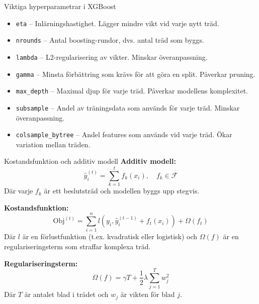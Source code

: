 \documentclass[10pt,english]{beamer}
\begin{document}
\begin{frame}{Viktiga hyperparametrar i XGBoost}
  \begin{itemize}
    \item \texttt{eta} – Inlärningshastighet. Lägger mindre vikt vid varje nytt träd.
    \item \texttt{nrounds} – Antal boosting-rundor, dvs. antal träd som byggs.
    \item \texttt{lambda} – L2-regularisering av vikter. Minskar överanpassning.
    \item \texttt{gamma} – Minsta förbättring som krävs för att göra en split. Påverkar pruning.
    \item \texttt{max\_depth} – Maximal djup för varje träd. Påverkar modellens komplexitet.
    \item \texttt{subsample} – Andel av träningsdata som används för varje träd. Minskar överanpassning.
    \item \texttt{colsample\_bytree} – Andel features som används vid varje träd. Ökar variation mellan träden.
    
    
  \end{itemize}
\end{frame}

\begin{frame}{Kostandsfunktion och additiv modell}
  \textbf{Additiv modell:}
  \begin{equation*}
    \hat{y}_i^{(t)} = \sum_{k=1}^{t} f_k(x_i), \quad f_k \in \mathcal{F}
  \end{equation*}
  Där varje \( f_k \) är ett beslutsträd och modellen byggs upp stegvis.

  \vspace{0.1cm}
  \textbf{Kostandsfunktion:}
  \begin{equation*}
    \text{Obj}^{(t)} = \sum_{i=1}^{n} l(y_i, \hat{y}_i^{(t-1)} + f_t(x_i)) + \Omega(f_t)
  \end{equation*}
  Där \( l \) är en förlustfunktion (t.ex. kvadratisk eller logistisk) och \( \Omega(f) \) är en regulariseringsterm som straffar komplexa träd.

  \vspace{0.1cm}
  \textbf{Regulariseringsterm:}
  \begin{equation*}
    \Omega(f) = \gamma T + \frac{1}{2} \lambda \sum_{j=1}^{T} w_j^2
  \end{equation*}
  Där \( T \) är antalet blad i trädet och \( w_j \) är vikten för blad \( j \).
\end{frame}
\end{document}
